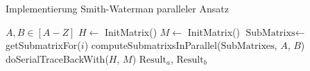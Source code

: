 \begin{algorithm}
  \caption{Implementierung Smith-Waterman paralleler Ansatz}
  \label{parallel}
  \begin{algorithmic}[1]
    \Require $A,B \in [A-Z]$
    \State $H\gets$ InitMatrix()
    \State $M\gets$ InitMatrix()
        
        \State $\text{SubMatrixs} \gets$ getSubmatrixFor($i$)
        \State computeSubmatrixsInParallel($\text{SubMatrixes}$, $A$, $B$)
      \EndFor
    \State doSerialTraceBackWith($H$, $M$)
    \State \Return $\text{Result}_a$, $\text{Result}_b$
  \end{algorithmic}
\end{algorithm}
